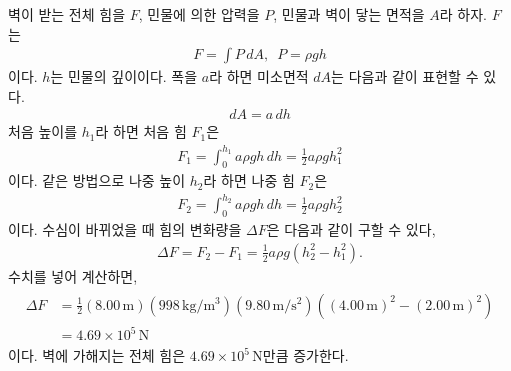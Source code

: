 \documentclass[floatfix,nofootinbib,superscriptaddress,fleqn]{revtex4-2}
\begin{document}
벽이 받는 전체 힘을 $F$, 민물에 의한 압력을 $P$, 
민물과 벽이 닿는 면적을 $A$라 하자.
$F$는
\begin{align}
  F = \int P\,dA,\,\,\,P = \rho g h
\end{align}
이다. $h$는 민물의 깊이이다.
폭을 $a$라 하면 미소면적 $dA$는 다음과 같이 표현할 수 있다.
\begin{align}
  dA = a\,dh
\end{align}
처음 높이를 $h_1$라 하면 처음 힘 $F_1$은
\begin{align}
  F_1 = \int_0^{h_1}a\rho g h\,dh = \frac{1}{2}a\rho g h^2_1
\end{align}
이다. 같은 방법으로
나중 높이 $h_2$라 하면 나중 힘 $F_2$은
\begin{align}
  F_2 = \int_0^{h_2}a\rho g h\,dh = \frac{1}{2}a\rho g h^2_2
\end{align}
이다. 수심이 바뀌었을 때 힘의 변화량을 $\Delta F$은 다음과 같이 구할 수 있다,
\begin{align}
  \Delta F = F_2 - F_1 = \frac{1}{2}a\rho g \left(h^2_2-h^2_1\right).
\end{align}
수치를 넣어 계산하면,
\begin{align}
  \begin{split}
    \Delta F &=\frac{1}{2}(8.00\,\mathrm{m})
    (998\,\mathrm{kg/m^3}) (9.80\,\mathrm{m/s^2}) 
    \left((4.00\,\mathrm{m})^2-(2.00\,\mathrm{m})^2\right)  \\
    &= 4.69\times 10^5\,\mathrm{N}
  \end{split}
\end{align}
이다. 벽에 가해지는 전체 힘은 $4.69\times 10^5\,\mathrm{N}$만큼 증가한다.
\vspace{1.cm}
\end{document}
